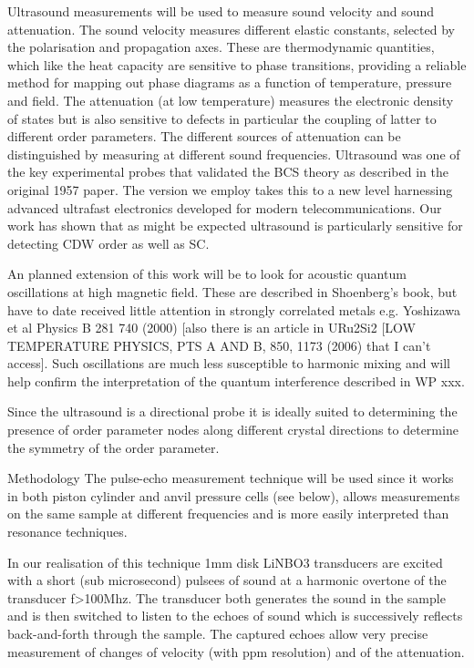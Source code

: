 Ultrasound measurements will be used to measure sound velocity and sound attenuation. The sound velocity measures different elastic constants, selected by the polarisation and propagation axes. These are thermodynamic quantities, which like the heat capacity are sensitive to phase transitions, providing a reliable method for mapping out phase diagrams as a function of temperature, pressure and field. The attenuation (at low temperature) measures the electronic density of states but is also sensitive to defects in particular the coupling of latter to different order parameters. The different sources of attenuation can be distinguished by measuring at different sound frequencies. Ultrasound was one of the key experimental probes that validated the BCS theory as described in the original 1957 paper. The version we employ takes this to a new level harnessing advanced ultrafast electronics developed for modern telecommunications. Our work has shown that as might be expected ultrasound is particularly sensitive for detecting CDW order as well as SC.

An planned extension of this work will be to look for acoustic quantum oscillations at high magnetic field.  These are described in Shoenberg’s book, but have to date received little attention in strongly correlated metals e.g. Yoshizawa et al Physics B 281 740 (2000) [also there is an article in URu2Si2 [LOW TEMPERATURE PHYSICS, PTS A AND B, 850, 1173 (2006) that I can’t access]. Such oscillations are much less susceptible to harmonic mixing and will help confirm the interpretation of the quantum interference described in WP xxx.

Since the ultrasound is a directional probe it is ideally suited to determining the presence of order parameter nodes along different crystal directions to determine the symmetry of the order parameter.

Methodology
The pulse-echo measurement technique will be used since it works in both piston cylinder and anvil pressure cells (see below), allows measurements on the same sample at different frequencies and is more easily interpreted than resonance techniques.

In our realisation of this technique 1mm disk LiNBO3 transducers are excited with a short (sub microsecond) pulsees of sound at a harmonic overtone of the transducer f>100Mhz. The transducer both generates the sound in the sample and is then switched to listen to the echoes of sound which is successively reflects back-and-forth through the sample. The captured echoes allow very precise measurement of changes of velocity (with ppm resolution) and of the attenuation.

